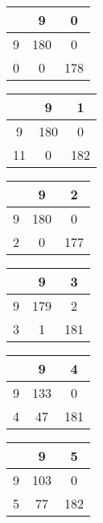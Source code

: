 \documentclass[12pt]{article}
\begin{document}
		\begin{multicols}{3}		
			\begin{tabular}{| c | c | c |}
				\hline
				& 9 & 0 \\ 
				\hline
				9 & 180 & 0 \\ 
				\hline
				0 & 0 & 178 \\ 
				\hline
			\end{tabular}
			\newline


			\begin{tabular}{| c | c | c |}
				\hline
				& 9 & 1 \\ 
				\hline
				9 & 180 & 0 \\ 
				\hline
				11 & 0 & 182 \\ 
				\hline
			\end{tabular}
			\newline


			\begin{tabular}{| c | c | c |}
				\hline
				& 9 & 2 \\ 
				\hline
				9 & 180 & 0 \\ 
				\hline
				2 & 0 & 177 \\ 
				\hline
			\end{tabular}
			\newline


			\begin{tabular}{| c | c | c |}
				\hline
				& 9 & 3 \\ 
				\hline
				9 & 179 & 2 \\ 
				\hline
				3 & 1 & 181 \\ 
				\hline
			\end{tabular}
			\newline


			\begin{tabular}{| c | c | c |}
				\hline
				& 9 & 4 \\ 
				\hline
				9 & 133 & 0 \\ 
				\hline
				4 & 47 & 181 \\ 
				\hline
			\end{tabular}
			\newline


			\begin{tabular}{| c | c | c |}
				\hline
				& 9 & 5 \\ 
				\hline
				9 & 103 & 0 \\ 
				\hline
				5 & 77 & 182 \\ 
				\hline
			\end{tabular}
			\newline



\end{multicols}
\end{document}
